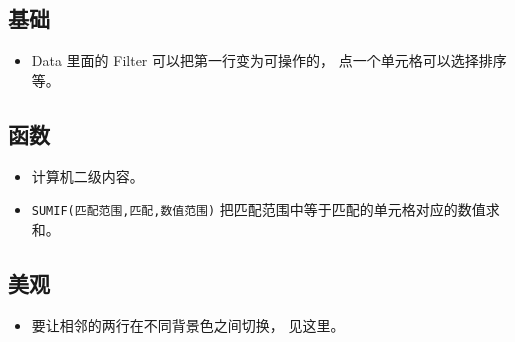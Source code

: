 
\begin{issues}
\issueDraft
\end{issues}

\subsection{基础}
\begin{itemize}
\item Data 里面的 Filter 可以把第一行变为可操作的， 点一个单元格可以选择排序等。
\end{itemize}

\subsection{函数}
\begin{itemize}
\item 计算机二级内容。
\item \verb|SUMIF(匹配范围,匹配,数值范围)| 把匹配范围中等于匹配的单元格对应的数值求和。
\end{itemize}

\subsection{美观}
\begin{itemize}
\item 要让相邻的两行在不同背景色之间切换， 见这里。
\end{itemize}
